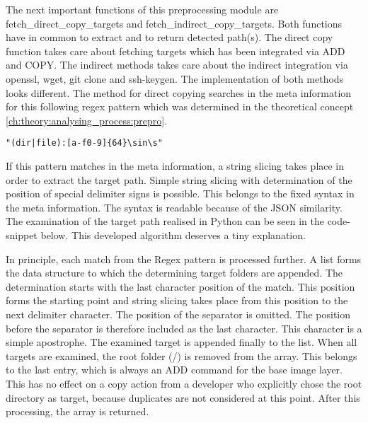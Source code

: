 The next important functions of this preprocessing module are fetch\_direct\_copy\_targets and fetch\_indirect\_copy\_targets. Both functions have in common to extract and to return detected path(s). The direct copy function takes care about fetching targets which has been integrated via ADD and COPY. The indirect methods takes care about the indirect integration via openssl, wget, git clone and ssh-keygen. The implementation of both methods looks different.
The method for direct copying searches in the meta information for this following regex pattern which was determined in the theoretical concept \ref{ch:theory:analysing_process:prepro}.
\begin{lstlisting}
"(dir|file):[a-f0-9]{64}\sin\s"
\end{lstlisting}
If this pattern matches in the meta information, a string slicing takes place in order to extract the target path. Simple string slicing with determination of the position of special delimiter signs is possible. This belongs to the fixed syntax in the meta information. The syntax is readable because of the JSON similarity.
The examination of the target path realised in Python can be seen in the code-snippet below.
This developed algorithm deserves a tiny explanation.

In principle, each match from the Regex pattern is processed further. A list forms the data structure to which the determining target folders are appended. The determination starts with the last character position of the match. This position forms the starting point and string slicing takes place from this position to the next delimiter character. The position of the separator is omitted. The position before the separator is therefore included as the last character. This character is a simple apostrophe. The examined target is appended finally to the list. When all targets are examined, the root folder (/) is removed from the array. This belongs to the last entry, which is always an ADD command for the base image layer. This has no effect on a copy action from a developer who explicitly chose the root directory as target, because duplicates are not considered at this point. After this processing, the array is returned.

